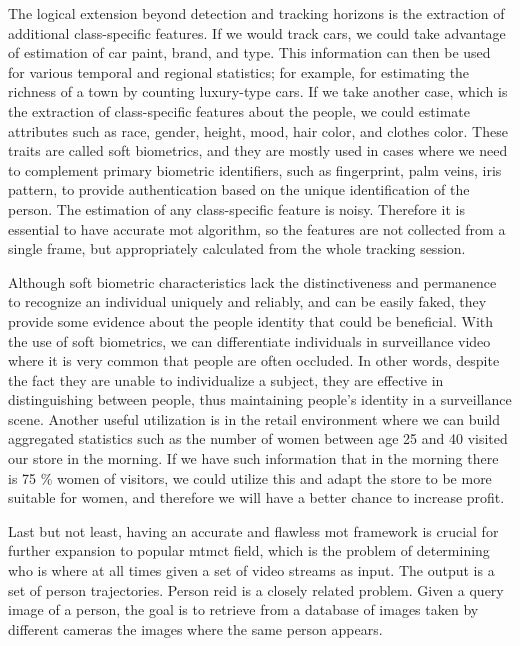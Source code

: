 \begin{introduction}
    The logical extension beyond detection and tracking horizons is the extraction of additional class-specific features. If we would track cars, we could take advantage of estimation of car paint, brand, and type. This information can then be used for various temporal and regional statistics; for example, for estimating the richness of a town by counting luxury-type cars. If we take another case, which is the extraction of class-specific features about the people, we could estimate attributes such as race, gender, height, mood, hair color, and clothes color. These traits are called soft biometrics, and they are mostly used in cases where we need to complement primary biometric identifiers, such as fingerprint, palm veins, iris pattern, to provide authentication based on the unique identification of the person. The estimation of any class-specific feature is noisy. Therefore it is essential to have accurate \gls{mot} algorithm, so the features are not collected from a single frame, but appropriately calculated from the whole tracking session.
    
    Although soft biometric characteristics lack the distinctiveness and permanence to recognize an individual uniquely and reliably, and can be easily faked, they provide some evidence about the people identity that could be beneficial. With the use of soft biometrics, we can differentiate individuals in surveillance video where it is very common that people are often occluded. In other words, despite the fact they are unable to individualize a subject, they are effective in distinguishing between people, thus maintaining people's identity in a surveillance scene. Another useful utilization is in the retail environment where we can build aggregated statistics such as the number of women between age 25 and 40 visited our store in the morning. If we have such information that in the morning there is 75 \% women of visitors, we could utilize this and adapt the store to be more suitable for women, and therefore we will have a better chance to increase profit.
    
    Last but not least, having an accurate and flawless \gls{mot} framework is crucial for further expansion to popular \gls{mtmct} field, which is the problem of determining who is where at all times given a set of video streams as input. The output is a set of person trajectories. Person \gls{reid} is a closely related problem. Given a query image of a person, the goal is to retrieve from a database of images taken by different cameras the images where the same person appears. \cite{ristani2016MTMC}
    

\end{introduction}
